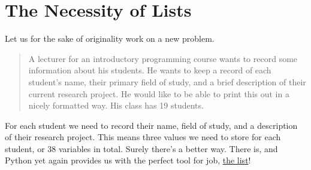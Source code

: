 \section{The Necessity of Lists}

Let us for the sake of originality work on a new problem.
\begin{quotation}     A lecturer for an introductory programming course wants to record    some information about his students. He wants to keep a record of    each student's name, their primary field of study, and a brief    description of their current research project. He would like to be    able to print this out in a nicely formatted way. His class has 19    students.    
\end{quotation}

For each student we need to record their name, field of study, and a   description of their research project. This means three values we need   to store for each student, or 38 variables in total. Surely there's a   better way. There is, and Python yet again provides us with the perfect   tool for job, \href{http://olympiad.cs.uct.ac.za/docs/python-docs-2.6/library/stdtypes.html#typesseq}{the list}!

